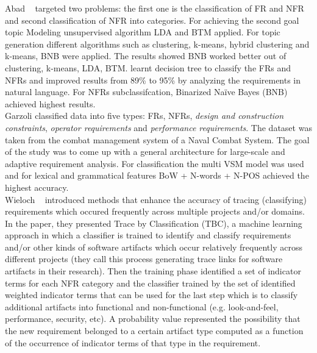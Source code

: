  Abad \etal ~ \cite{Abad:2017} targeted two problems: the first one is the
 classification of FR and NFR and second classification of NFR into categories.
 For achieving the
 second goal topic Modeling unsupervised algorithm LDA and BTM
 applied. For topic generation different
 algorithms such as clustering, k-means, hybrid clustering and k-means, BNB were
 applied. The results showed BNB worked better out of clustering, k-means, LDA,
 BTM. learnt decision tree to classify the FRs
 and NFRs and improved results from 89\% to 95\% by analyzing the requirements in natural language. For NFRs
subclassifcation, Binarized Naïve Bayes (BNB) achieved highest results.
\\

Garzoli \cite {Garzoli:2013} classified data into five types:
FRs, NFRs, \emph{design and construction constraints}, \emph{operator
requirements} and \emph{performance requirements}. The dataset was taken from
the combat management system of a Naval Combat System. The goal of the study was to come up with a general
architecture for large-scale and adaptive requirement analysis. For
classification the multi VSM model was used and for lexical
and grammatical features BoW + N-words + N-POS achieved the highest accuracy.\\

Wieloch \etal~\cite{Wieloch:2013} introduced methods that enhance the accuracy
of tracing (classifying) requirements which occured frequently across multiple
projects and/or domains. In the paper, they presented Trace by Classification
(TBC), a machine learning approach in which a classifier is trained to identify
and classify requirements and/or other kinds of software artifacts which occur
relatively frequently across different projects (they call this process
generating trace links for software artifacts in their research).  Then the training phase identified a set of indicator
terms for each NFR category and the classifier trained by the
set of identified weighted indicator terms that can be used for the last step which is to classify additional
artifacts into functional and non-functional (e.g.
look-and-feel, performance, security, etc). A probability value represented the
possibility that the new requirement belonged to a certain artifact type
computed as a function of the occurrence of indicator terms of that type in the
requirement.\\
